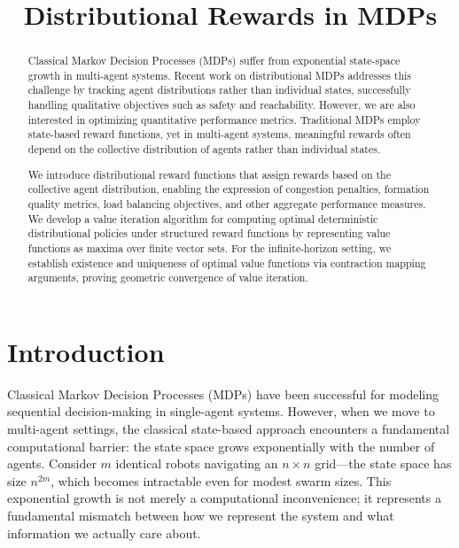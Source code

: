 \documentclass{article}
\title{Distributional Rewards in MDPs}
\begin{document}
\maketitle

\begin{abstract}
Classical Markov Decision Processes (MDPs) suffer from exponential state-space growth in multi-agent systems. Recent work on distributional MDPs addresses this challenge by tracking agent distributions rather than individual states, successfully handling qualitative objectives such as safety and reachability. However, we are also interested in optimizing quantitative performance metrics. Traditional MDPs employ state-based reward functions, yet in multi-agent systems, meaningful rewards often depend on the collective distribution of agents rather than individual states.

We introduce distributional reward functions that assign rewards based on the collective agent distribution, enabling the expression of congestion penalties, formation quality metrics, load balancing objectives, and other aggregate performance measures. We develop a value iteration algorithm for computing optimal deterministic distributional policies under structured reward functions by representing value functions as maxima over finite vector sets. For the infinite-horizon setting, we establish existence and uniqueness of optimal value functions via contraction mapping arguments, proving geometric convergence of value iteration.
\end{abstract}

\section{Introduction}

Classical Markov Decision Processes (MDPs) have been successful for modeling sequential decision-making in single-agent systems. However, when we move to multi-agent settings, the classical state-based approach encounters a fundamental computational barrier: the state space grows exponentially with the number of agents. Consider $m$ identical robots navigating an $n \times n$ grid—the state space has size $n^{2m}$, which becomes intractable even for modest swarm sizes. This exponential growth is not merely a computational inconvenience; it represents a fundamental mismatch between how we represent the system and what information we actually care about.
\end{document}
